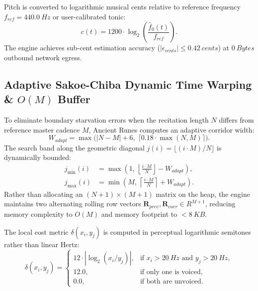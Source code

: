 \documentclass[11pt,a4paper,reqno]{article}
\def\mathrm#1{#1}%
\def\mathbb#1{#1}%
\theoremstyle{plain}
\theoremstyle{definition}
\theoremstyle{remark}
\numberwithin{equation}{section}
\begin{document}
Pitch is converted to logarithmic musical cents relative to reference frequency $f_{\mathrm{ref}} = 440.0\ \mathrm{Hz}$ or user-calibrated tonic:
\begin{equation}
\label{eq:cents_formula}
c(t) = 1200 \cdot \log_2 \left( \frac{\hat{f}_0(t)}{f_{\mathrm{ref}}} \right).
\end{equation}
The engine achieves sub-cent estimation accuracy ($|\epsilon_{\mathrm{cents}}| \le 0.42\ \mathrm{cents}$) at $0\ \mathrm{Bytes}$ outbound network egress.

\subsection{\texorpdfstring{Adaptive Sakoe-Chiba Dynamic Time Warping \& $O(M)$ Buffer}{Adaptive Sakoe-Chiba Dynamic Time Warping and O(M) Buffer}}
To eliminate boundary starvation errors when the recitation length $N$ differs from reference master cadence $M$, Ancient Runes computes an adaptive corridor width:
\begin{equation}
\label{eq:adaptive_window}
W_{\mathrm{adapt}} = \max\Big( |N - M| + 6, \; \lceil 0.18 \cdot \max(N, M) \rceil \Big).
\end{equation}
The search band along the geometric diagonal $j(i) = \lfloor (i \cdot M) / N \rfloor$ is dynamically bounded:
\begin{align}
\label{eq:j_bounds_min}
j_{\min}(i) &= \max\left(1, \, \left\lfloor \frac{i \cdot M}{N} \right\rfloor - W_{\mathrm{adapt}}\right), \\
\label{eq:j_bounds_max}
j_{\max}(i) &= \min\left(M, \, \left\lceil \frac{i \cdot M}{N} \right\rceil + W_{\mathrm{adapt}}\right).
\end{align}
Rather than allocating an $(N+1) \times (M+1)$ matrix on the heap, the engine maintains two alternating rolling row vectors $\mathbf{R}_{\mathrm{prev}}, \mathbf{R}_{\mathrm{curr}} \in \mathbb{R}^{M+1}$, reducing memory complexity to $O(M)$ and memory footprint to $< 8\ \mathrm{KB}$.

The local cost metric $\delta(x_i, y_j)$ is computed in perceptual logarithmic semitones rather than linear Hertz:
\begin{equation}
\label{eq:dtw_cents_metric}
\delta(x_i, y_j) = \begin{cases}
12 \cdot \left| \log_2(x_i / y_j) \right|, & \text{if } x_i > 20\ \mathrm{Hz} \text{ and } y_j > 20\ \mathrm{Hz}, \\
12.0, & \text{if only one is voiced}, \\
0.0, & \text{if both are unvoiced}.
\end{cases}
\end{equation}
\end{document}

